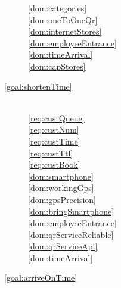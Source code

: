 \begin{description}
\begin{description}
            \ref{dom:categories}  ~\\
            \ref{dom:oneToOneQr}  ~\\
            \ref{dom:internetStores}  ~\\
            \ref{dom:employeeEntrance}  ~\\
            \ref{dom:timeArrival}  ~\\
            \ref{dom:capStores}  ~\\


            \item[\ref{goal:shortenTime}]  ~\\

            \ref{req:custQueue}  ~\\
            \ref{req:custNum}  ~\\
            \ref{req:custTime}  ~\\
            \ref{req:custTtl}  ~\\
            \ref{req:custBook}  ~\\

            \ref{dom:smartphone}  ~\\
            \ref{dom:workingGps}  ~\\
            \ref{dom:gpsPrecision}  ~\\
            \ref{dom:bringSmartphone}  ~\\
            \ref{dom:employeeEntrance}  ~\\
            \ref{dom:qrServiceReliable}  ~\\
            \ref{dom:qrServiceApi}  ~\\
            \ref{dom:timeArrival}  ~\\



            \item[\ref{goal:arriveOnTime}]  ~\\


\end{description}
\end{description}
